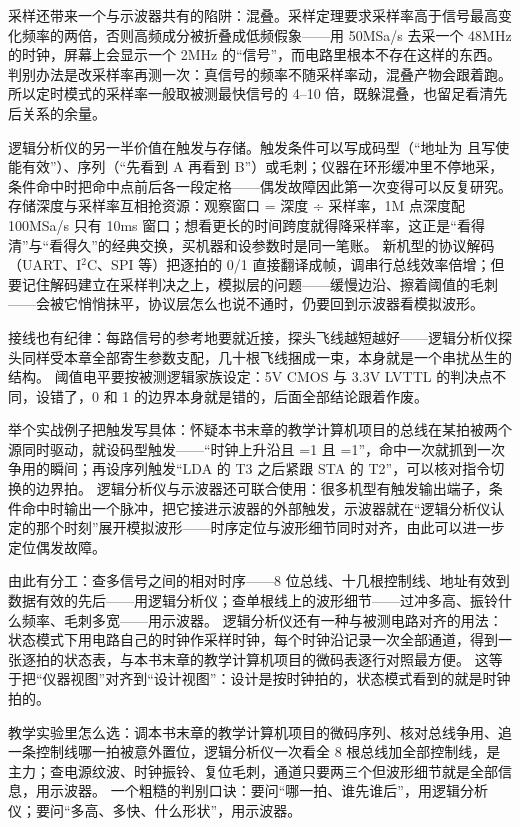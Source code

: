 采样还带来一个与示波器共有的陷阱：混叠。采样定理要求采样率高于信号最高变化频率的两倍，否则高频成分被折叠成低频假象——用 50MSa/s 去采一个 48MHz 的时钟，屏幕上会显示一个 2MHz 的“信号”，而电路里根本不存在这样的东西。
判别办法是改采样率再测一次：真信号的频率不随采样率动，混叠产物会跟着跑。
所以定时模式的采样率一般取被测最快信号的 4--10 倍，既躲混叠，也留足看清先后关系的余量。

逻辑分析仪的另一半价值在触发与存储。触发条件可以写成码型（“地址为  且写使能有效”）、序列（“先看到 A 再看到 B”）或毛刺；仪器在环形缓冲里不停地采，条件命中时把命中点前后各一段定格——偶发故障因此第一次变得可以反复研究。
存储深度与采样率互相抢资源：观察窗口 = 深度 ÷ 采样率，1M 点深度配 100MSa/s 只有 10ms 窗口；想看更长的时间跨度就得降采样率，这正是“看得清”与“看得久”的经典交换，买机器和设参数时是同一笔账。
新机型的协议解码（UART、I$^2$C、SPI 等）把逐拍的 0/1 直接翻译成帧，调串行总线效率倍增；但要记住解码建立在采样判决之上，模拟层的问题——缓慢边沿、擦着阈值的毛刺——会被它悄悄抹平，协议层怎么也说不通时，仍要回到示波器看模拟波形。

接线也有纪律：每路信号的参考地要就近接，探头飞线越短越好——逻辑分析仪探头同样受本章全部寄生参数支配，几十根飞线捆成一束，本身就是一个串扰丛生的结构。
阈值电平要按被测逻辑家族设定：5V CMOS 与 3.3V LVTTL 的判决点不同，设错了，0 和 1 的边界本身就是错的，后面全部结论跟着作废。

举个实战例子把触发写具体：怀疑本书末章的教学计算机项目的总线在某拍被两个源同时驱动，就设码型触发——“时钟上升沿且 =1 且 =1”，命中一次就抓到一次争用的瞬间；再设序列触发“LDA 的 T3 之后紧跟 STA 的 T2”，可以核对指令切换的边界拍。
逻辑分析仪与示波器还可联合使用：很多机型有触发输出端子，条件命中时输出一个脉冲，把它接进示波器的外部触发，示波器就在“逻辑分析仪认定的那个时刻”展开模拟波形——时序定位与波形细节同时对齐，由此可以进一步定位偶发故障。

由此有分工：查多信号之间的相对时序——8 位总线、十几根控制线、地址有效到数据有效的先后——用逻辑分析仪；查单根线上的波形细节——过冲多高、振铃什么频率、毛刺多宽——用示波器。
逻辑分析仪还有一种与被测电路对齐的用法：状态模式下用电路自己的时钟作采样时钟，每个时钟沿记录一次全部通道，得到一张逐拍的状态表，与本书末章的教学计算机项目的微码表逐行对照最方便。
这等于把“仪器视图”对齐到“设计视图”：设计是按时钟拍的，状态模式看到的就是时钟拍的。

教学实验里怎么选：调本书末章的教学计算机项目的微码序列、核对总线争用、追一条控制线哪一拍被意外置位，逻辑分析仪一次看全 8 根总线加全部控制线，是主力；查电源纹波、时钟振铃、复位毛刺，通道只要两三个但波形细节就是全部信息，用示波器。
一个粗糙的判别口诀：要问“哪一拍、谁先谁后”，用逻辑分析仪；要问“多高、多快、什么形状”，用示波器。

